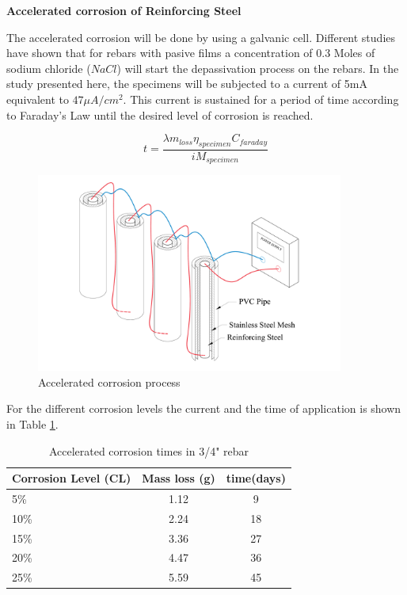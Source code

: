 \textbf{Accelerated corrosion  of Reinforcing Steel}

The accelerated corrosion will be done by using a galvanic cell. Different studies \cite{Ghods2010} have shown that for rebars with pasive films a concentration of 0.3 Moles of sodium chloride ($NaCl$) will start the depassivation process on the rebars. In the study presented here, the specimens will be subjected to a current of 5mA equivalent to $47\mu A/cm^2$. This current is sustained for a period of time according to Faraday's Law until the desired level of corrosion is reached.

\begin{equation}
	t=\frac{\lambda m_{loss} \eta_{specimen} C_{faraday}}{i M_{specimen}}
	\label{eq.FaradayEq}
\end{equation}

\begin{figure}[htbp]
	\centering
	\includegraphics[width=0.9\textwidth]{Chapter-3/figs/AcceleratedCorrosionProcedure}
	\caption{Accelerated corrosion process}
	\label{fig:AcceleratedCorrosion}
\end{figure}

For the different corrosion levels the current and the time of application is shown in Table \ref{tab:AcceleratedCorrosionTime}. 

\begin{table}[htbp]
	\caption{Accelerated corrosion times in 3/4" rebar}
	\label{tab:AcceleratedCorrosionTime}
	\centering	
		\begin{tabular}{|l|c|c|}
		\hline
		Corrosion Level (CL) & Mass loss (g)   & time(days)     \\  \hline	
		5\%                  & 1.12            & 9  \\  \hline	
		10\%                 & 2.24            & 18 \\  \hline	
		15\%                 & 3.36            & 27 \\  \hline	
		20\%                 & 4.47            & 36 \\  \hline	
		25\%                 & 5.59            & 45 \\  \hline	
		\end{tabular}
\end{table}



